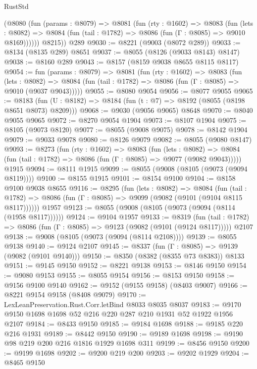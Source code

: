 \begin{lexlean}{RustStd}
\begin{coremodule}
        (@8080
          (fun (params : @8079) =>
          @8081
            (fun (rty : @1602) =>
            @8083
              (fun (lets : @8082) =>
              @8084 (fun (tail : @1782) => @8086 (fun (Γ : @8085) => @9010 @8169))))))
        @8215))
    @289
@9030 := @8221 (@9003 (@8072 @289))
@9033 := @8134 (@8135 @289) @8651
@9037 := @8055 (@8126 (@9033 @8143) @8147)
@9038 := @8160 @289
@9043 := @8157 (@8159 @9038 @8655 @8115 @8117)
@9054 := fun (params : @8079) =>
  @8081
    (fun (rty : @1602) =>
    @8083
      (fun (lets : @8082) =>
      @8084 (fun (tail : @1782) => @8086 (fun (Γ : @8085) => @9010 (@9037 @9043)))))
@9055 := @8080 @9054
@9056 := @8077 @9055
@9065 := @8183 (fun (U : @8182) => @8184 (fun (t : @7) => @8192 (@8055 (@8198 @8651 @8073) @8209)))
@9068 := @9030 (@9056 @9065) @8648
@9070 := @8040 @9055 @9065
@9072 := @8270 @9054 @1904
@9073 := @8107 @1904
@9075 := @8105 (@9073 @8120)
@9077 := @8055 (@9008 @9075)
@9078 := @8142 @1904
@9079 := @9033 @9078
@9080 := @8126 @9079
@9082 := @8055 (@9080 @8147)
@9093 := @8273
    (fun (rty : @1602) =>
    @8083
      (fun (lets : @8082) =>
      @8084 (fun (tail : @1782) => @8086 (fun (Γ : @8085) => @9077 (@9082 @9043)))))
    @1915
@9094 := @8111 @1915
@9099 := @8055 (@9008 (@8105 (@9073 (@9094 @8119))))
@9100 := @8155 @1915
@9101 := @8154 @9100
@9104 := @8158 @9100 @9038 @8655
@9116 := @8295
    (fun (lets : @8082) =>
    @8084
      (fun (tail : @1782) => @8086 (fun (Γ : @8085) => @9099 (@9082 (@9101 (@9104 @8115 @8117))))))
    @1957
@9123 := @8055 (@9008 (@8105 (@9073 (@9094 (@8114 (@1958 @8117))))))
@9124 := @9104 @1957
@9133 := @8319
    (fun (tail : @1782) => @8086 (fun (Γ : @8085) => @9123 (@9082 (@9101 (@9124 @8117)))))
    @2107
@9138 := @9008 (@8105 (@9073 (@9094 (@8114 @2108))))
@9139 := @8055 @9138
@9140 := @9124 @2107
@9145 := @8337 (fun (Γ : @8085) => @9139 (@9082 (@9101 @9140)))
@9150 := @8350 (@8382 (@8355 @73 @8383)) @8133
@9151 := @9145 @9150
@9152 := @8221 @9138
@9153 := @8146 @9150
@9154 := @9080 @9153
@9155 := @8055 @9154
@9156 := @8153 @9150
@9158 := @9156 @9100 @9140
@9162 := @9152 (@9155 @9158) (@8403 @9007)
@9166 := @8221 @9154 @9158 (@8408 @9079)
@9170 := LexLeanPreservation.Rust.Corr.letBind @8033 @8035 @8037
@9183 := @9170 @9150 @1698 @1698 @52 @216 @220 @287 @210 @1931 @52 @1922 @1956 @2107
@9184 := @8433 @9150
@9185 := @9184 @1698
@9188 := @9185 @220 @216 @1931
@9189 := @8442 @9150
@9190 := @9189 @1698
@9198 := @9190 @98 @219 @200 @216 @1816 @1929 @1698 @311
@9199 := @8456 @9150
@9200 := @9199 @1698
@9202 := @9200 @219 @200
@9203 := @9202 @1929
@9204 := @8465 @9150

\end{coremodule}
\end{lexlean}
